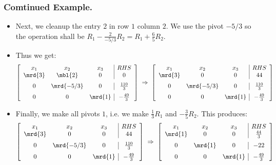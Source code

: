 \begin{frame}%
  \frametitle{Comtinued Example.}
  \begin{itemize}%

\item
Next, we cleanup the entry $2$ in row $1$ column $2$. We use the pivot
$-5/3$ so the operation shall be $R_1-\frac{2}{-5/3}R_2=R_1+\frac{6}{5}R_2$.

\item Thus we get:
$$\left[ \begin {array}{ccc|c}
x_1 & x_2 & x_3 & RHS\\
\mrd{3}&\mbl{2}&0&0\\\noalign{\medskip}
0&\mrd{-5/3}&0&\frac{110}{3}\\\noalign{\medskip}
0&0&\mrd{1}&{-\frac {49}{3}}\end {array} \right]
~\Rightarrow~
\left[ \begin {array}{ccc|c}
x_1 & x_2 & x_3 & RHS\\
\mrd{3}&0&0&44\\\noalign{\medskip}
0&\mrd{-5/3}&0&\frac{110}{3}\\\noalign{\medskip}
0&0&\mrd{1}&{-\frac {49}{3}}\end {array} \right]
$$

\item Finally, we make all pivots $1$, i.e. we make $\frac{1}{3}R_1$ and
$-\frac{3}{5}R_2$.
This produces:
$$
\left[ \begin {array}{ccc|c}
x_1 & x_2 & x_3 & RHS\\
\mrd{3}&0&0&44\\\noalign{\medskip}
0&\mrd{-5/3}&0&\frac{110}{3}\\\noalign{\medskip}
0&0&\mrd{1}&{-\frac {49}{3}}\end {array} \right]
~\Rightarrow~
\left[ \begin {array}{ccc|c}
x_1 & x_2 & x_3 & RHS\\
\mrd{1}&0&0&\frac{44}{3}\\\noalign{\medskip}
0&\mrd{1}&0&-22\\\noalign{\medskip}
0&0&\mrd{1}&{-\frac {49}{3}}\end {array} \right]
$$

\end{itemize}
\end{frame}

